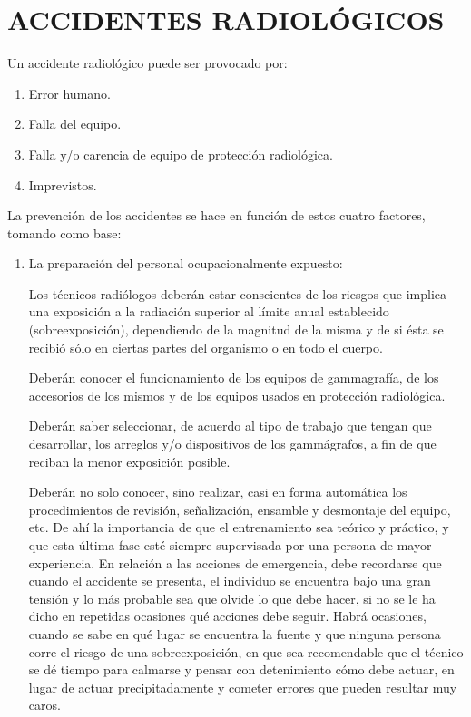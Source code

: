 \section*{ACCIDENTES RADIOLÓGICOS}

Un accidente radiológico puede ser provocado por:

\begin{enumerate}
    \item [a)] Error humano.
    \item [b)] Falla del equipo.
    \item [c)] Falla y/o carencia de equipo de protección radiológica.
    \item [d)] Imprevistos.
\end{enumerate}

La prevención de los accidentes se hace en función de estos cuatro factores, tomando como base:

\begin{enumerate}
    \item [a)] La preparación del personal ocupacionalmente expuesto:

        Los técnicos radiólogos deberán estar conscientes de los riesgos que implica una exposición a la radiación superior al límite anual establecido (sobreexposición), dependiendo de la magnitud de la misma y de si ésta se recibió sólo en ciertas partes del organismo o en todo el cuerpo.

        Deberán conocer el funcionamiento de los equipos de gammagrafía, de los accesorios de los mismos y de los equipos usados en protección radiológica.

        Deberán saber seleccionar, de acuerdo al tipo de trabajo que tengan que desarrollar, los arreglos y/o dispositivos de los gammágrafos, a fin de que reciban la menor exposición posible.

        Deberán no solo conocer, sino realizar, casi en forma automática los procedimientos de revisión, señalización, ensamble y desmontaje del equipo, etc. De ahí la importancia de que el entrenamiento sea teórico y práctico, y que esta última fase esté siempre supervisada por una persona de mayor experiencia. En relación a las acciones de emergencia, debe recordarse que cuando el accidente se presenta, el individuo se encuentra bajo una gran tensión y lo más probable sea que olvide lo que debe hacer, si no se le ha dicho en repetidas ocasiones qué acciones debe seguir. Habrá ocasiones, cuando se sabe en qué lugar se encuentra la fuente y que ninguna persona corre el riesgo de una sobreexposición, en que sea recomendable que el técnico se dé tiempo para calmarse y pensar con detenimiento cómo debe actuar, en lugar de actuar precipitadamente y cometer errores que pueden resultar muy caros.
\end{enumerate}
